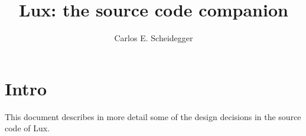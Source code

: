 \documentclass{book}
\author{Carlos E. Scheidegger}
\title{Lux: the source code companion}
\begin{document}
\maketitle
\chapter{Intro}
This document describes in more detail some of the design decisions in
the source code of Lux.


\end{document}
